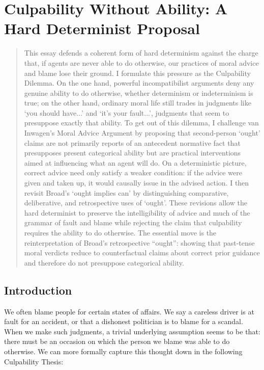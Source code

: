 \chapter{Culpability Without Ability: A Hard Determinist Proposal}


\begin{quote}
    This essay defends a coherent form of hard determinism against the
    charge that, if agents are never able to do otherwise, our practices of
    moral advice and blame lose their ground. I formulate this pressure as
    the Culpability Dilemma. On the one hand, powerful incompatibilist
    arguments deny any genuine ability to do otherwise, whether determinism
    or indeterminism is true; on the other hand, ordinary moral life still
    trades in judgments like `you should have...' and `it's your fault...',
    judgments that seem to presuppose exactly that ability. To get out of
    this dilemma, I challenge van Inwagen's Moral Advice Argument by
    proposing that second-person `ought' claims are not primarily reports of
    an antecedent normative fact that presupposes present categorical
    ability but are practical interventions aimed at influencing what an
    agent will do. On a deterministic picture, correct advice need only
    satisfy a weaker condition: if the advice were given and taken up, it
    would causally issue in the advised action. I then revisit Broad's
    `ought implies can' by distinguishing comparative, deliberative, and
    retrospective uses of `ought'. These revisions allow the hard
    determinist to preserve the intelligibility of advice and much of the
    grammar of fault and blame while rejecting the claim that culpability
    requires the ability to do otherwise. The essential move is the
    reinterpretation of Broad's retrospective ``ought'': showing that
    past-tense moral verdicts reduce to counterfactual claims about correct
    prior guidance and therefore do not presuppose categorical ability.
\end{quote}

\vspace{\credgap}

\section{Introduction}

We often blame people for certain states of affairs. We say a careless
driver is at fault for an accident, or that a dishonest politician is to
blame for a scandal. When we make such judgments, a trivial underlying
assumption seems to be that: there must be an occasion on which the
person we blame was able to do otherwise.  We can more formally capture
this thought down in the following Culpability Thesis:

